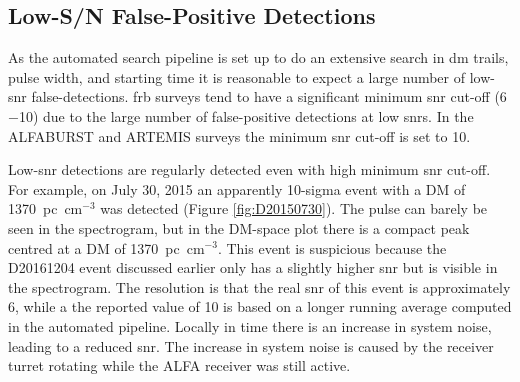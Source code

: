 \documentclass[a4paper,fleqn,usenatbib]{mnras}
\begin{document}
\subsection{Low-S/N False-Positive Detections}
\label{sec:low_snr}

As the automated search pipeline is set up to do an extensive search in \gls{dm}
trails, pulse width, and starting time it is reasonable to expect a large number
of low-\gls{snr} false-detections.  \gls{frb} surveys tend to have a significant
minimum \gls{snr} cut-off (6$-$10) due to the large number of false-positive
detections at low \glspl{snr}.  In the ALFABURST and ARTEMIS
\citep{2015MNRAS.452.1254K} surveys the minimum \gls{snr} cut-off is set to 10.

Low-\gls{snr} detections are regularly detected even with high minimum \gls{snr} cut-off.
For example, on July 30, 2015 an apparently 10-sigma event with a DM of
1370~pc~cm$^{-3}$ was detected (Figure \ref{fig:D20150730}). The pulse can
barely be seen in the spectrogram, but in the DM-space plot there is a compact
peak centred at a DM of 1370~pc~cm$^{-3}$. This event is suspicious because the
D20161204 event discussed earlier only has a slightly higher \gls{snr} but is
visible in the spectrogram. The resolution is that the real \gls{snr} of this
event is approximately 6, while a the reported value of 10 is based on a longer
running average computed in the automated pipeline. Locally in time there is an
increase in system noise, leading to a reduced \gls{snr}. The increase in system noise
is caused by the receiver turret rotating while the ALFA receiver was still
active.
\end{document}
